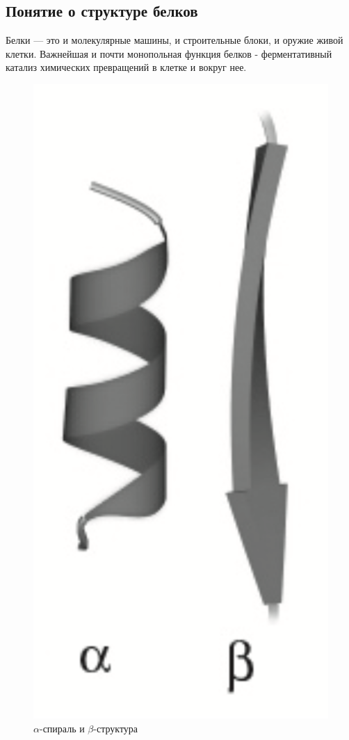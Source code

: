 \documentclass[
11pt,%
tightenlines,%
twoside,%
onecolumn,%
nofloats,%
nobibnotes,%
nofootinbib,%
superscriptaddress,%
noshowpacs,%
centertags]%
{revtex4}
\begin{document}
\subsection{Понятие о структуре белков}
Белки — это и молекулярные машины, и строительные блоки, и оружие живой клетки. Важнейшая и почти монопольная функция белков - ферментативный катализ химических превращений в клетке и вокруг нее. 

\begin{figure}
	\centering
	\includegraphics[scale=0.3]{alpha}
	\caption{$\alpha$-спираль и $\beta$-структура}
\end{figure}
\end{document}
